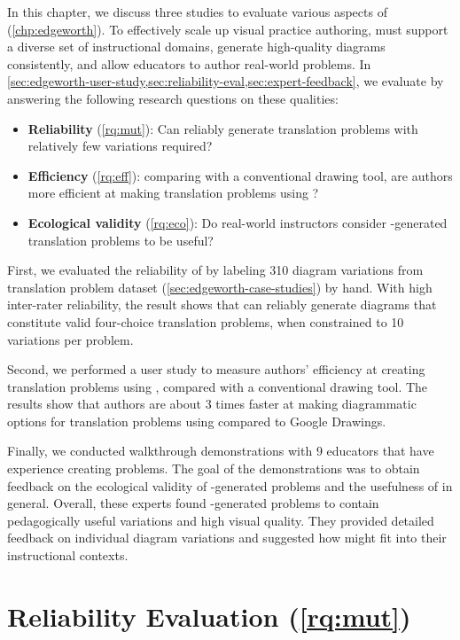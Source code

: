 In this chapter, we discuss three studies to evaluate various aspects of \Edgeworth (\cref{chp:edgeworth}). To effectively scale up visual practice authoring, \Edgeworth must support a diverse set of instructional domains, generate high-quality diagrams consistently, and allow educators to author real-world problems. In \cref{sec:edgeworth-user-study,sec:reliability-eval,sec:expert-feedback}, we evaluate \Edgeworth by answering the following research questions on these qualities:

\begin{itemize}
    \item\textbf{Reliability} (\ref{rq:mut}): Can \Edgeworth reliably generate translation problems with relatively few variations required?
    \item\textbf{Efficiency} (\ref{rq:eff}): comparing with a conventional drawing tool, are authors more efficient at making translation problems using \Edgeworth? 
    \item\textbf{Ecological validity} (\ref{rq:eco}): Do real-world instructors consider \Edgeworth-generated translation problems to be useful? 
\end{itemize}

First, we evaluated the reliability of \Edgeworth by labeling 310 diagram variations from translation problem dataset (\cref{sec:edgeworth-case-studies}) by hand. With high inter-rater reliability, the result shows that \Edgeworth can reliably generate diagrams that constitute valid four-choice translation problems, when constrained to 10 variations per problem.

Second, we performed a user study to measure authors' efficiency at creating translation problems using \Edgeworth, compared with a conventional drawing tool. The results show that authors are about 3 times faster at making diagrammatic options for translation problems using \Edgeworth compared to Google Drawings. 

Finally, we conducted walkthrough demonstrations with 9 educators that have experience creating problems. The goal of the demonstrations was to obtain feedback on the ecological validity of \Edgeworth-generated problems and the usefulness of \Edgeworth in general. Overall, these experts found \Edgeworth-generated problems to contain pedagogically useful variations and high visual quality. They provided detailed feedback on individual diagram variations and suggested how \Edgeworth might fit into their instructional contexts. 

\section{Reliability Evaluation (\ref{rq:mut})}
\label{sec:reliability-eval}

